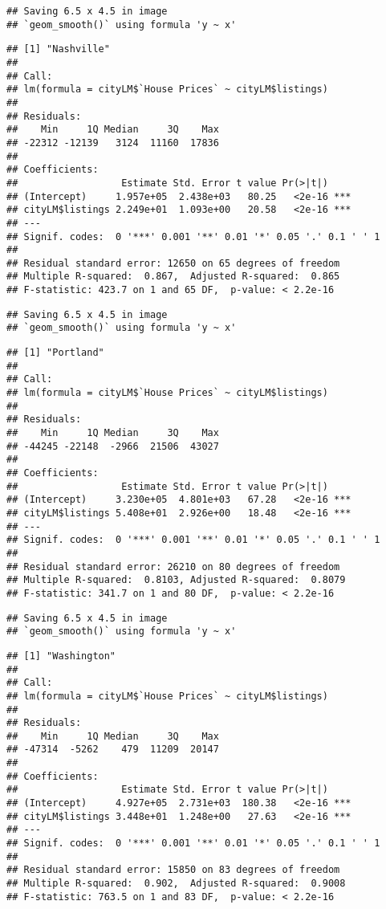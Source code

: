 \documentclass[
]{article}
\begin{document}
\begin{verbatim}
## Saving 6.5 x 4.5 in image
## `geom_smooth()` using formula 'y ~ x'
\end{verbatim}

\begin{verbatim}
## [1] "Nashville"
## 
## Call:
## lm(formula = cityLM$`House Prices` ~ cityLM$listings)
## 
## Residuals:
##    Min     1Q Median     3Q    Max 
## -22312 -12139   3124  11160  17836 
## 
## Coefficients:
##                  Estimate Std. Error t value Pr(>|t|)    
## (Intercept)     1.957e+05  2.438e+03   80.25   <2e-16 ***
## cityLM$listings 2.249e+01  1.093e+00   20.58   <2e-16 ***
## ---
## Signif. codes:  0 '***' 0.001 '**' 0.01 '*' 0.05 '.' 0.1 ' ' 1
## 
## Residual standard error: 12650 on 65 degrees of freedom
## Multiple R-squared:  0.867,  Adjusted R-squared:  0.865 
## F-statistic: 423.7 on 1 and 65 DF,  p-value: < 2.2e-16
\end{verbatim}

\begin{verbatim}
## Saving 6.5 x 4.5 in image
## `geom_smooth()` using formula 'y ~ x'
\end{verbatim}

\begin{verbatim}
## [1] "Portland"
## 
## Call:
## lm(formula = cityLM$`House Prices` ~ cityLM$listings)
## 
## Residuals:
##    Min     1Q Median     3Q    Max 
## -44245 -22148  -2966  21506  43027 
## 
## Coefficients:
##                  Estimate Std. Error t value Pr(>|t|)    
## (Intercept)     3.230e+05  4.801e+03   67.28   <2e-16 ***
## cityLM$listings 5.408e+01  2.926e+00   18.48   <2e-16 ***
## ---
## Signif. codes:  0 '***' 0.001 '**' 0.01 '*' 0.05 '.' 0.1 ' ' 1
## 
## Residual standard error: 26210 on 80 degrees of freedom
## Multiple R-squared:  0.8103, Adjusted R-squared:  0.8079 
## F-statistic: 341.7 on 1 and 80 DF,  p-value: < 2.2e-16
\end{verbatim}

\begin{verbatim}
## Saving 6.5 x 4.5 in image
## `geom_smooth()` using formula 'y ~ x'
\end{verbatim}

\begin{verbatim}
## [1] "Washington"
## 
## Call:
## lm(formula = cityLM$`House Prices` ~ cityLM$listings)
## 
## Residuals:
##    Min     1Q Median     3Q    Max 
## -47314  -5262    479  11209  20147 
## 
## Coefficients:
##                  Estimate Std. Error t value Pr(>|t|)    
## (Intercept)     4.927e+05  2.731e+03  180.38   <2e-16 ***
## cityLM$listings 3.448e+01  1.248e+00   27.63   <2e-16 ***
## ---
## Signif. codes:  0 '***' 0.001 '**' 0.01 '*' 0.05 '.' 0.1 ' ' 1
## 
## Residual standard error: 15850 on 83 degrees of freedom
## Multiple R-squared:  0.902,  Adjusted R-squared:  0.9008 
## F-statistic: 763.5 on 1 and 83 DF,  p-value: < 2.2e-16
\end{verbatim}
\end{document}
